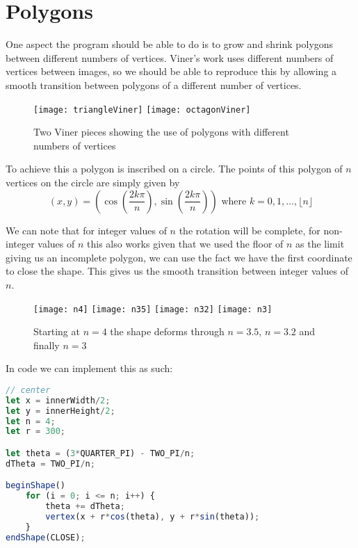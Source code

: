 \section{Polygons}
\label{Polygons}
One aspect the program should be able to do is to grow and shrink polygons
between different numbers of vertices. Viner's work uses different numbers of
vertices between images, so we should be able to reproduce this by allowing a
smooth transition between polygons of a different number of vertices. 

\begin{figure}[H]
    \centering
    \texttt{[image: triangleViner]}
    \hspace{0.2cm}
    \texttt{[image: octagonViner]}
    \caption{Two Viner pieces showing the use of polygons with different numbers
    of vertices}
\end{figure}


To achieve this a polygon is inscribed on a circle. The points of this polygon
of $n$ vertices on the circle are simply given by $$(x, y) = (\cos(\frac{2k
\pi}{n}), \sin(\frac{2k\pi}{n})) \text{ where } k = 0, 1, \ldots, \lfloor n
\rfloor$$ 

We can note that for integer values of $n$ the rotation will be complete, for
non-integer values of $n$ this also works given that we used the floor of $n$ as
the limit giving us an incomplete polygon, we can use the fact we have the first
coordinate to close the shape. This gives us the smooth transition between
integer values of $n$.

\begin{figure}[H]
    \centering
    \texttt{[image: n4]}
    \texttt{[image: n35]}
    \texttt{[image: n32]}
    \texttt{[image: n3]}
    \caption{Starting at $n=4$ the shape deforms through $n=3.5$, $n=3.2$ and
    finally $n=3$}
\end{figure}

In code we can implement this as such:
\begin{lstlisting}[language=JavaScript]
// center
let x = innerWidth/2;
let y = innerHeight/2;
let n = 4;
let r = 300;

let theta = (3*QUARTER_PI) - TWO_PI/n;
dTheta = TWO_PI/n;

beginShape()
    for (i = 0; i <= n; i++) {
        theta += dTheta;
        vertex(x + r*cos(theta), y + r*sin(theta));
    }
endShape(CLOSE);
\end{lstlisting}

